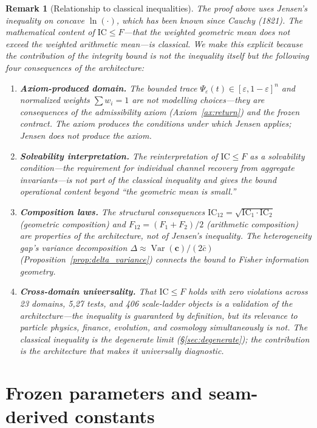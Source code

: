 \documentclass[
  aps,
  prd,
  preprint,
  superscriptaddress,
  nofootinbib,
  floatfix
]{revtex4-2}
\newcommand{\IC}{\mathrm{IC}}
\newtheorem{remark}{Remark}
\begin{document}
\begin{remark}[Relationship to classical inequalities]
\label{rem:jensen}
The proof above uses Jensen's inequality on concave $\ln(\cdot)$, which has been known since Cauchy (1821).
The mathematical content of $\IC \le F$---that the weighted geometric mean does not exceed the weighted
arithmetic mean---is classical. We make this explicit because the contribution of the integrity
bound is not the inequality itself but the following four consequences of the architecture:
\begin{enumerate}[leftmargin=2.2em]
  \item \textbf{Axiom-produced domain.}
  The bounded trace $\Psi_\varepsilon(t)\in[\varepsilon,1-\varepsilon]^n$ and normalized weights
  $\sum w_i = 1$ are not modelling choices---they are consequences of the admissibility axiom
  (Axiom~\ref{ax:return}) and the frozen contract. The axiom produces the conditions under which
  Jensen applies; Jensen does not produce the axiom.
  \item \textbf{Solvability interpretation.}
  The reinterpretation of $\IC\le F$ as a \emph{solvability condition}---the requirement for
  individual channel recovery from aggregate invariants---is not part of the classical inequality
  and gives the bound operational content beyond ``the geometric mean is small.''
  \item \textbf{Composition laws.}
  The structural consequences $\IC_{12}=\sqrt{\IC_1\cdot\IC_2}$ (geometric composition) and
  $F_{12}=(F_1+F_2)/2$ (arithmetic composition) are properties of the architecture, not of Jensen's
  inequality. The heterogeneity gap's variance decomposition
  $\Delta \approx \operatorname{Var}(\bm{c})/(2\bar{c})$ (Proposition~\ref{prop:delta_variance})
  connects the bound to Fisher information geometry.
  \item \textbf{Cross-domain universality.}
  That $\IC\le F$ holds with zero violations across 23 domains, 5{,}27 tests, and 406 scale-ladder
  objects is a validation of the architecture---the inequality is guaranteed by definition, but its
  \emph{relevance} to particle physics, finance, evolution, and cosmology simultaneously is not.
  The classical inequality is the degenerate limit (\S\ref{sec:degenerate}); the contribution is the
  architecture that makes it universally diagnostic.
\end{enumerate}
\end{remark}
\section{Frozen parameters and seam-derived constants}
\label{sec:frozen}
\end{document}
